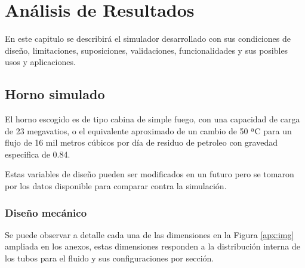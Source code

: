 \chapter{Análisis de Resultados}

\par En este capitulo se describirá el simulador desarrollado con sus condiciones de diseño, limitaciones, suposiciones, validaciones, funcionalidades y sus posibles usos y aplicaciones.

\section{Horno simulado}

\par El horno escogido es de tipo cabina de simple fuego, con una capacidad de carga de 23 megavatios, o el equivalente aproximado de un cambio de 50 ªC para un flujo de 16 mil metros cúbicos por día de residuo de petroleo con gravedad especifica de 0.84.

\par Estas variables de diseño pueden ser modificados en un futuro pero se tomaron por los datos disponible para comparar contra la simulación.

\subsection{Diseño mecánico}

\par Se puede observar a detalle cada una de las dimensiones en la Figura \ref{apx:img} ampliada en los anexos, estas dimensiones responden a la distribución interna de los tubos para el fluido y sus configuraciones por sección.

